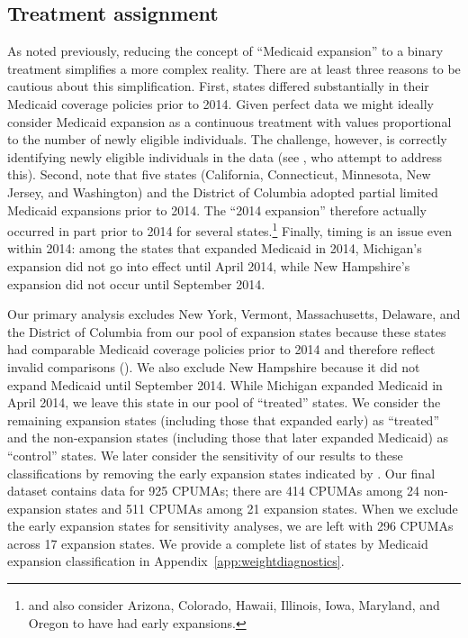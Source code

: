 \documentclass[aoas]{imsart}
\theoremstyle{plain}
\theoremstyle{remark}
\begin{document}
\subsection{Treatment assignment} \label{sssec:txassign}

As noted previously, reducing the concept of ``Medicaid expansion'' to a binary treatment simplifies a more complex reality. There are at least three reasons to be cautious about this simplification. First, states differed substantially in their Medicaid coverage policies prior to 2014. Given perfect data we might ideally consider Medicaid expansion as a continuous treatment with values proportional to the number of newly eligible individuals. The challenge, however, is correctly identifying newly eligible individuals in the data (see \cite{frean2017premium}, who attempt to address this). Second, \cite{frean2017premium} note that five states (California, Connecticut, Minnesota, New Jersey, and Washington) and the District of Columbia adopted partial limited Medicaid expansions prior to 2014. The ``2014 expansion'' therefore actually occurred in part prior to 2014 for several states.\footnote{\cite{kaestner2017effects} and \cite{courtemanche2017early} also consider Arizona, Colorado, Hawaii, Illinois, Iowa, Maryland, and Oregon to have had early expansions.} Finally, timing is an issue even within 2014: among the states that expanded Medicaid in 2014, Michigan's expansion did not go into effect until April 2014, while New Hampshire's expansion did not occur until September 2014.

Our primary analysis excludes New York, Vermont, Massachusetts, Delaware, and the District of Columbia from our pool of expansion states because these states had comparable Medicaid coverage policies prior to 2014 and therefore reflect invalid comparisons (\cite{kaestner2017effects}). We also exclude New Hampshire because it did not expand Medicaid until September 2014. While Michigan expanded Medicaid in April 2014, we leave this state in our pool of ``treated'' states. We consider the remaining expansion states (including those that expanded early) as ``treated'' and the non-expansion states (including those that later expanded Medicaid) as ``control'' states. We later consider the sensitivity of our results to these classifications by removing the early expansion states indicated by \cite{frean2017premium}. Our final dataset contains data for 925 CPUMAs; there are 414 CPUMAs among 24 non-expansion states and 511 CPUMAs among 21 expansion states. When we exclude the early expansion states for sensitivity analyses, we are left with 296 CPUMAs across 17 expansion states. We provide a complete list of states by Medicaid expansion classification in Appendix~\ref{app:weightdiagnostics}.
\end{document}

